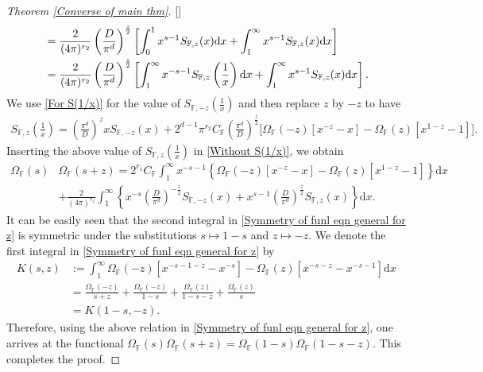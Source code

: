 \documentclass[12pt,reqno]{amsart}
\renewcommand{\(}{\left\(}
\renewcommand{\)}{\right\)}
\renewcommand{\[}{\left\[}
\renewcommand{\]}{\right\]}
\numberwithin{equation}{section}
\theoremstyle{plain}
\begin{document}
\begin{proof}[Theorem \rm{\ref{Converse of main thm}}][]
\begin{align}
&= \frac{2}{(4\pi)^{r_2}}\left(\frac{D}{\pi^d}\right)^{\frac{z}{2}}\left[\int_0^1 x^{s-1}S_{\mathbb{F}, z}(x) \text{d}x + \int_1^\infty x^{s-1}S_{\mathbb{F}, z}(x)\text{d}x \right] \notag\\
&= \frac{2}{(4\pi)^{r_2}}\left(\frac{D}{\pi^d}\right)^{\frac{z}{2}}\left[\int_1^\infty x^{-s-1}S_{\mathbb{F}, z}\left(\frac{1}{x}\right) \text{d}x + \int_1^\infty x^{s-1}S_{\mathbb{F}, z}(x) \text{d}x \right]. \label{Without S(1/x)}
\end{align}
We use \eqref{For S(1/x)} for the value of $S_{\mathbb{F}, -z}\left(\frac{1}{x} \right)$ and then replace $z$ by $-z$ to have
\begin{align*}
S_{\mathbb{F}, z}\left(\frac{1}{x} \right)
= \left(\frac{\pi^d}{D}\right)^{z}\!\!xS_{\mathbb{F}, -z}(x) + 2^{d-1}\pi^{r_2}\!C_{\mathbb{F}}\left(\frac{\pi^d}{D}\right)^{\frac{z}{2}}\bigg[\Omega_{\mathbb{F}}(-z)\left[x^{-z} - x \right] 
- \Omega_{\mathbb{F}}(z) \left[x^{1-z} - 1 \right]\bigg].
\end{align*}
Inserting the above value of $S_{\mathbb{F}, z}\left(\frac{1}{x} \right)$ in \eqref{Without S(1/x)}, we obtain
\begin{align}
\Omega_{\mathbb{F}}(s)&\Omega_{\mathbb{F}}(s+z) = 2^{r_1}C_{\mathbb{F}}\int_1^\infty x^{-s-1}\left\{\Omega_{\mathbb{F}}(-z)\left[x^{-z} - x \right] - \Omega_{\mathbb{F}}(z) \left[x^{1-z} - 1 \right]\right\}\text{d}x \nonumber \\
&+ \frac{2}{(4\pi)^{r_2}}\int_1^\infty \left\{ x^{-s}\left(\frac{D}{\pi^d}\right)^{-\frac{z}{2}}S_{\mathbb{F}, -z}(x) + x^{s-1}\left(\frac{D}{\pi^d}\right)^{\frac{z}{2}} S_{\mathbb{F}, z}(x) \right\} \text{d}x.
\label{Symmetry of funl eqn general for z}
\end{align}
It can be easily seen that the second integral in \eqref{Symmetry of funl eqn general for z} is symmetric under the substitutions $s \mapsto 1-s$ and $z \mapsto -z$. We denote the first integral in \eqref{Symmetry of funl eqn general for z} by 
\begin{align*}
K(s, z) &:= \int_1^\infty \Omega_{\mathbb{F}}(-z)\left[x^{-s-1-z} - x^{-s} \right] - \Omega_{\mathbb{F}}(z)\left[x^{-s-z} - x^{-s-1} \right] \text{d}x \\
&= \frac{\Omega_{\mathbb{F}}(-z)}{s+z} + \frac{\Omega_{\mathbb{F}}(-z)}{1-s} + \frac{\Omega_{\mathbb{F}}(z)}{1-s-z} + \frac{\Omega_{\mathbb{F}}(z)}{s} \\
&= K(1-s, -z).
\end{align*}
Therefore, using the above relation in \eqref{Symmetry of funl eqn general for z}, one arrives at the functional $\Omega_{\mathbb{F}}(s)\Omega_{\mathbb{F}}(s+z) = \Omega_{\mathbb{F}}(1-s)\Omega_{\mathbb{F}}(1-s-z)$. This completes the proof.
\end{proof}
\end{document}
